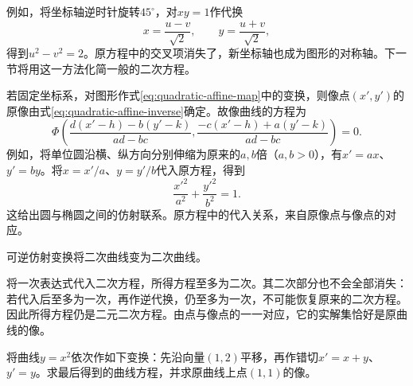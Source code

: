 例如，将坐标轴逆时针旋转\(45^\circ\)，对\(xy=1\)作代换
\begin{equation*}
    x=\frac{u-v}{\sqrt2} , \qquad y=\frac{u+v}{\sqrt2} ,
\end{equation*}
得到\(u^2-v^2=2\)。原方程中的交叉项消失了，新坐标轴也成为图形的对称轴。下一节将用这一方法化简一般的二次方程。

若固定坐标系，对图形作式\eqref{eq:quadratic-affine-map}中的变换，则像点\((x',y')\)的原像由式\eqref{eq:quadratic-affine-inverse}确定。故像曲线的方程为
\begin{equation}\label{eq:quadratic-image-equation}
    \Phi\left(\frac{d(x'-h)-b(y'-k)}{ad-bc},
              \frac{-c(x'-h)+a(y'-k)}{ad-bc}\right)=0 .
\end{equation}
例如，将单位圆沿横、纵方向分别伸缩为原来的\(a,b\)倍（\(a,b>0\)），有\(x'=ax\)、\(y'=by\)。将\(x=x'/a\)、\(y=y'/b\)代入原方程，得到
\begin{equation*}
    \frac{x'^2}{a^2}+\frac{y'^2}{b^2}=1 .
\end{equation*}
这给出圆与椭圆之间的仿射联系。原方程中的代入关系，来自原像点与像点的对应。

\begin{proposition}\label{prop:quadratic-affine-degree}
可逆仿射变换将二次曲线变为二次曲线。
\end{proposition}

将一次表达式代入二次方程，所得方程至多为二次。其二次部分也不会全部消失：若代入后至多为一次，再作逆代换，仍至多为一次，不可能恢复原来的二次方程。因此所得方程仍是二元二次方程。由点与像点的一一对应，它的实解集恰好是原曲线的像。

\begin{example}\label{ex:quadratic-parabola-shear}
将曲线\(y=x^2\)依次作如下变换：先沿向量\((1,2)\)平移，再作错切\(x'=x+y\)、\(y'=y\)。求最后得到的曲线方程，并求原曲线上点\((1,1)\)的像。
\end{example}


